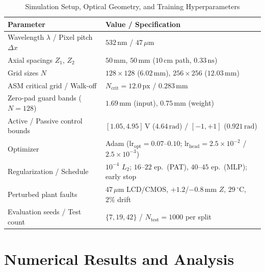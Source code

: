 \documentclass[journal]{IEEEtran}
\begin{document}
\begin{table}[!t]
  \centering
  \caption{Simulation Setup, Optical Geometry, and Training Hyperparameters}
  \label{tab:sim_setup}
  \begin{tabular}{@{}ll@{}}
    \toprule
    \textbf{Parameter} & \textbf{Value / Specification} \\
    \midrule
    Wavelength $\lambda$ / Pixel pitch $\Delta x$ & $532\,\text{nm}$ / $47\,\mu\text{m}$ \\
    Axial spacings $Z_1$, $Z_2$ & $50\,\text{mm}$, $50\,\text{mm}$ ($10\,\text{cm}$ path, $0.33\,\text{ns}$) \\
    Grid sizes $N$ & $128\times 128$ ($6.02\,\text{mm}$), $256\times 256$ ($12.03\,\text{mm}$) \\
    ASM critical grid / Walk-off & $N_{\mathrm{crit}} = 12.0\,\text{px}$ / $0.283\,\text{mm}$ \\
    Zero-pad guard bands ($N=128$) & $1.69\,\text{mm}$ (input), $0.75\,\text{mm}$ (weight) \\
    Active / Passive control bounds & $[1.05, 4.95]\,\text{V}$ ($4.64\,\text{rad}$) / $[-1, +1]$ ($0.921\,\text{rad}$) \\
    Optimizer & Adam ($\text{lr}_{\mathrm{opt}}=0.07\text{--}0.10$; $\text{lr}_{\mathrm{head}}=2.5\times 10^{-2}$ / $2.5\times 10^{-3}$) \\
    Regularization / Schedule & $10^{-4}$ $L_2$; $16\text{--}22$ ep.\ (PAT), $40\text{--}45$ ep.\ (MLP); early stop \\
    Perturbed plant faults & $47\,\mu\text{m}$ LCD/CMOS, $+1.2$/$-0.8\,\text{mm}$ $Z$, $29\,^\circ\text{C}$, $2\%$ drift \\
    Evaluation seeds / Test count & $\{7, 19, 42\}$ / $N_{\mathrm{test}}=1000$ per split \\
    \bottomrule
  \end{tabular}
\end{table}

\section{Numerical Results and Analysis}
\end{document}

